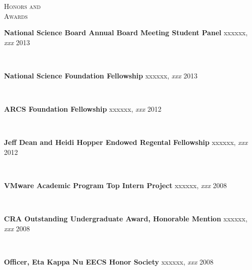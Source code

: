 \documentclass[10pt,times]{report}
\newlength{\sectiongap}
\newlength{\entrygap}
\newlength{\sectioncolwidth}
\newlength{\colgap}
\newlength{\stuffwidth}
\def\ifEqString#1#2{\def\testa{#1}\def\testb{#2}%
  \ifx\testa\testb}
\newenvironment{rtable}{
  \begin{minipage}{\textwidth}
  }{
  \end{minipage}
}
\newenvironment{rentry}[3][xxx]{
  \begin{minipage}[t]{\hsize}
    \textbf{#2}\ifEqString{#1}{xxx}\relax\else, \textit{#1}\fi
    \hspace{\stretch{1}} #3 \\
  }{
    \removelastskip
  \end{minipage}
  \\[\entrygap]  %
}
\newenvironment{rsection}[1]{
  \begin{minipage}[t]{\sectioncolwidth}
    \textsc{#1}
  \end{minipage}
  \hspace{\colgap}
  \begin{minipage}[t]{\stuffwidth}
  }{
    \removelastskip
  \end{minipage}
  \\[\sectiongap]
}
\begin{document}
\begin{rtable}
\vspace{1.0em}
  \begin{rsection}{Honors and\\Awards}
    \begin{rentry}{National Science Board Annual Board Meeting Student
        Panel}{2013}
    \end{rentry} \vspace{-0.5em}

    \begin{rentry}{National Science Foundation Fellowship}{2013}
    \end{rentry} \vspace{-0.5em}

    \begin{rentry}{ARCS Foundation Fellowship}{2012}
    \end{rentry} \vspace{-0.5em}

    \begin{rentry}{Jeff Dean and Heidi Hopper Endowed Regental Fellowship}{2012}
    \end{rentry} \vspace{-0.5em}

    \begin{rentry}{VMware Academic Program Top Intern Project}{2008}
    \end{rentry} \vspace{-0.5em}
    
    \begin{rentry}{CRA Outstanding Undergraduate Award, Honorable
      Mention}{2008}
    \end{rentry} \vspace{-0.5em}

    \begin{rentry}{Officer, Eta Kappa Nu EECS Honor Society}{2008}
    \end{rentry} \vspace{-0.5em}


\end{rsection}
\end{rtable}
\end{document}
